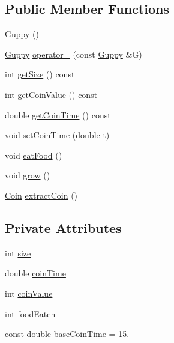 \subsection*{Public Member Functions}
\begin{DoxyCompactItemize}
\item 
\mbox{\hyperlink{class_guppy_aa78f8b5323b1015c968a8edab52773f5}{Guppy}} ()
\item 
\mbox{\hyperlink{class_guppy}{Guppy}} \mbox{\hyperlink{class_guppy_aa30f6db726124f670123daadb53a581f}{operator=}} (const \mbox{\hyperlink{class_guppy}{Guppy}} \&G)
\item 
int \mbox{\hyperlink{class_guppy_a38fa7d69e65a6778e1cdf6a0b542f295}{get\+Size}} () const
\item 
int \mbox{\hyperlink{class_guppy_ae190cb7bd1cbc2b36c36d99cd75848e0}{get\+Coin\+Value}} () const
\item 
double \mbox{\hyperlink{class_guppy_ae292cfe7a3d33ed860da190b930441b3}{get\+Coin\+Time}} () const
\item 
void \mbox{\hyperlink{class_guppy_a95cab69dac975dcdf44f0fdc698764e1}{set\+Coin\+Time}} (double t)
\item 
void \mbox{\hyperlink{class_guppy_a50115297f5c2f4df46e3613e09db115e}{eat\+Food}} ()
\item 
void \mbox{\hyperlink{class_guppy_a342d7b7c5a5c456b2acfa03a8e24494e}{grow}} ()
\item 
\mbox{\hyperlink{class_coin}{Coin}} \mbox{\hyperlink{class_guppy_ab3fef72b059ac88a3e901af4db113e1d}{extract\+Coin}} ()
\end{DoxyCompactItemize}
\subsection*{Private Attributes}
\begin{DoxyCompactItemize}
\item 
int \mbox{\hyperlink{class_guppy_af72ab3a1333652d6568daab2364f8667}{size}}
\item 
double \mbox{\hyperlink{class_guppy_a7499e4ee2b98b89ed5d90401c77e85e7}{coin\+Time}}
\item 
int \mbox{\hyperlink{class_guppy_af83c4763130d7c27b81b65c8395cf336}{coin\+Value}}
\item 
int \mbox{\hyperlink{class_guppy_a5eb6f3d64c0498fd4fcea47b645aa93f}{food\+Eaten}}
\item 
const double \mbox{\hyperlink{class_guppy_a89464da317c0ba87d07cb47d03d2fb18}{base\+Coin\+Time}} = 15.
\end{DoxyCompactItemize}
